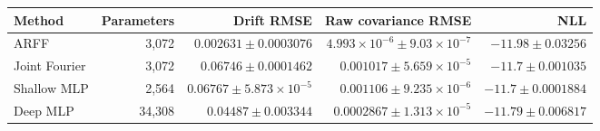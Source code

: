 \begin{tabular}{lrrrr}\toprule Method & Parameters & Drift RMSE & Raw covariance RMSE & NLL\\\midrule
ARFF & 3,072 & $0.002631\pm 0.0003076$ & $4.993\times10^{-6}\pm 9.03\times10^{-7}$ & $-11.98\pm 0.03256$\\
Joint Fourier & 3,072 & $0.06746\pm 0.0001462$ & $0.001017\pm 5.659\times10^{-5}$ & $-11.7\pm 0.001035$\\
Shallow MLP & 2,564 & $0.06767\pm 5.873\times10^{-5}$ & $0.001106\pm 9.235\times10^{-6}$ & $-11.7\pm 0.0001884$\\
Deep MLP & 34,308 & $0.04487\pm 0.003344$ & $0.0002867\pm 1.313\times10^{-5}$ & $-11.79\pm 0.006817$\\
\bottomrule\end{tabular}
